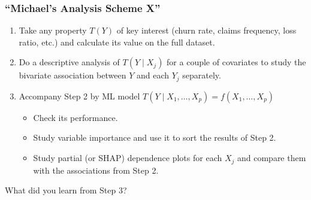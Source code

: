 \documentclass[
    utf8,
    aspectratio=169
]{beamer}  %
\begin{document}
\begin{frame}
	\frametitle{``Michael’s Analysis Scheme X''}
	\begin{enumerate}
		\item Take any property $T(Y)$ of key interest (churn rate, claims frequency, loss ratio, etc.) and calculate its value on the full dataset.
		\item Do a descriptive analysis of $T(Y \mid X_j)$ for a couple of covariates to study the bivariate association between $Y$ and each $Y_j$ separately.
		\item Accompany Step 2 by ML model $T(Y\mid X_1, \dots, X_p)=f(X_1, \dots, X_p)$
			\begin{itemize}
				\item Check its performance.
				\item Study variable importance and use it to sort the results of Step 2.
				\item Study partial (or SHAP) dependence plots for each $X_j$ and compare them with the associations from Step 2.
			\end{itemize}
	\end{enumerate}

	\vfill
	
	\begin{block}{What did you learn from Step 3?}
	\end{block}
\end{frame}

\end{document}
